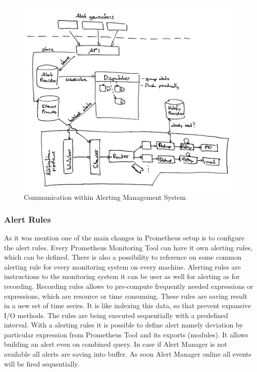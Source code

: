 \begin{figure}[htbp]
\begin{center}
  \includegraphics[width=\linewidth]{components/3/alert_arch_detailed.png}
  \caption{Communication within Alerting Management System}
  \label{fig:alert_arch_detailed}
\end{center}
\end{figure}

\subsubsection{Alert Rules}\label{Alert Rules}

As it was mention one of the main changes in Prometheus setup is to configure the alert rules. Every Prometheus Monitoring Tool can have it own alerting rules, which can be defined. There is also a possibility to reference on some common alerting rule for every monitoring system on every machine. 
Alerting rules are instructions to the monitoring system it can be user as well for alerting as for recording. 
Recording rules allows to pre-compute frequently needed expressions or expressions, which are resource or time consuming.  These rules are saving result in a new set of time series. It is like indexing this data, so that prevent expansive I/O methods. 
The rules are being executed sequentially with a predefined interval. 
With a alerting rules it is possible to define alert namely deviation by particular expression from Prometheus Tool and its exports (modules). It allows building an alert even on combined query. 
In case if Alert Manager is not available all alerts are saving into buffer. As soon Alert Manager online all events will be fired sequentially. 

